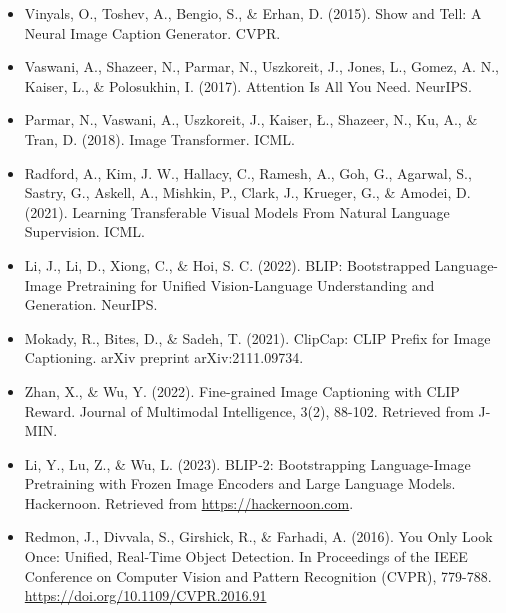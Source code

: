 \documentclass[14pt]{extarticle}
\begin{document}
\begin{itemize}
    \item Vinyals, O., Toshev, A., Bengio, S., \& Erhan, D. (2015). Show and Tell: A Neural Image Caption Generator. CVPR.
    \item Vaswani, A., Shazeer, N., Parmar, N., Uszkoreit, J., Jones, L., Gomez, A. N., Kaiser, L., \& Polosukhin, I. (2017). Attention Is All You Need. NeurIPS.
    \item Parmar, N., Vaswani, A., Uszkoreit, J., Kaiser, Ł., Shazeer, N., Ku, A., \& Tran, D. (2018). Image Transformer. ICML.
    \item Radford, A., Kim, J. W., Hallacy, C., Ramesh, A., Goh, G., Agarwal, S., Sastry, G., Askell, A., Mishkin, P., Clark, J., Krueger, G., \& Amodei, D. (2021). Learning Transferable Visual Models From Natural Language Supervision. ICML.
    \item Li, J., Li, D., Xiong, C., \& Hoi, S. C. (2022). BLIP: Bootstrapped Language-Image Pretraining for Unified Vision-Language Understanding and Generation. NeurIPS.
    \item Mokady, R., Bites, D., \& Sadeh, T. (2021). ClipCap: CLIP Prefix for Image Captioning. arXiv preprint arXiv:2111.09734.
    \item Zhan, X., \& Wu, Y. (2022). Fine-grained Image Captioning with CLIP Reward. Journal of Multimodal Intelligence, 3(2), 88-102. Retrieved from J-MIN.
    \item Li, Y., Lu, Z., \& Wu, L. (2023). BLIP-2: Bootstrapping Language-Image Pretraining with Frozen Image Encoders and Large Language Models. Hackernoon. Retrieved from \url{https://hackernoon.com}.
    \item Redmon, J., Divvala, S., Girshick, R., \& Farhadi, A. (2016). You Only Look Once: Unified, Real-Time Object Detection. In Proceedings of the IEEE Conference on Computer Vision and Pattern Recognition (CVPR), 779-788. \url{https://doi.org/10.1109/CVPR.2016.91}
\end{itemize}
\end{document}
